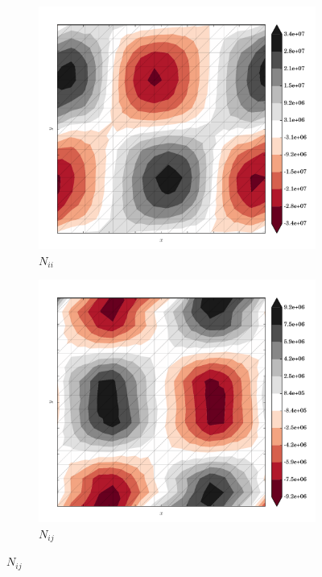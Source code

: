 \begin{figure}
  \begin{subfigure}[b]{0.3\linewidth}
    \includegraphics[width=\linewidth]{images/stress_balance/BP/N_ii.pdf}
  \caption{$N_{ii}$}
  \label{bp_N_ii}
  \end{subfigure}
  \begin{subfigure}[b]{0.3\linewidth}
    \includegraphics[width=\linewidth]{images/stress_balance/BP/N_ij.pdf}
  \caption{$N_{ij}$}
  \label{bp_N_ij}
  \end{subfigure}

\end{figure}
